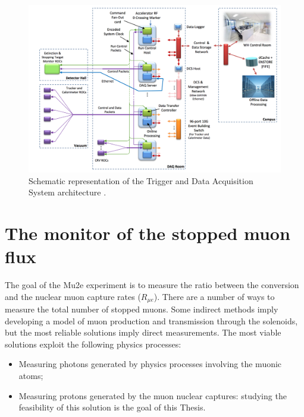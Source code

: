 \documentclass[12pt,a4paper,openright, oneside, titlepage]{book} %
\begin{document}
\begin{figure}[h!]
\centering
\includegraphics[scale=0.6]{TDAQ}
\caption{Schematic representation of the Trigger and Data Acquisition System architecture \cite{TDAQ}.}
\label{_TDAQ}
\end{figure}

\section{The monitor of the stopped muon flux}
The goal of the Mu2e experiment is to measure the ratio between the conversion and the nuclear muon capture rates
($R_{\mu e}$). 
There are a number of ways to measure the total number of stopped muons. 
Some indirect methods imply developing a model
of muon production and transmission through the solenoids, 
but the most reliable solutions imply direct measurements.
The most viable solutions exploit the following physics processes:
\begin{itemize}
\item Measuring photons generated by physics processes involving the muonic atoms;  
\item Measuring protons generated by the muon nuclear captures: 
studying the feasibility of this solution is the goal of this Thesis.
\end{itemize} 
\end{document}
